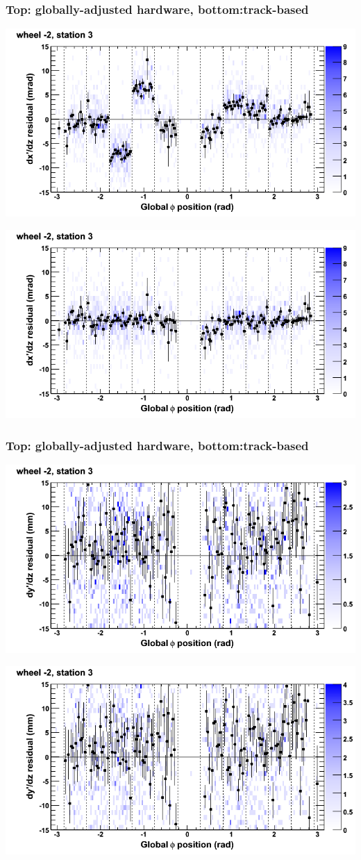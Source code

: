 \documentclass[compress]{beamer}
\begin{document}
\begin{frame}
\frametitle{Top: globally-adjusted hardware, bottom:track-based}
\includegraphics[width=0.7\linewidth]{NOV4_mapplots_HW/DTvsphi_st3whA_dxdz.png}

\includegraphics[width=0.7\linewidth]{NOV4_mapplots/DTvsphi_st3whA_dxdz.png}
\end{frame}

\begin{frame}
\frametitle{Top: globally-adjusted hardware, bottom:track-based}
\includegraphics[width=0.7\linewidth]{NOV4_mapplots_HW/DTvsphi_st3whA_dydz.png}

\includegraphics[width=0.7\linewidth]{NOV4_mapplots/DTvsphi_st3whA_dydz.png}
\end{frame}
\end{document}
